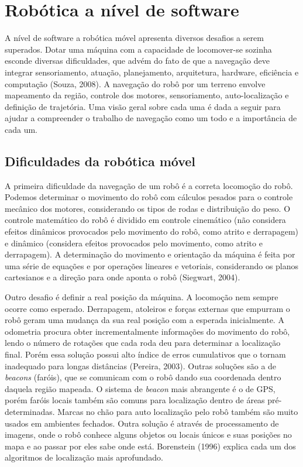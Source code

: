 \section{Robótica a nível de software}

A nível de software a robótica móvel apresenta diversos desafios a serem superados. Dotar uma máquina com a capacidade de locomover-se sozinha esconde diversas dificuldades, que advém do fato de que a navegação deve integrar sensoriamento, atuação, planejamento, arquitetura, hardware, eficiência e computação (Souza, 2008). A navegação do robô por um terreno envolve mapeamento da região, controle dos motores, sensoriamento, auto-localização e definição de trajetória. Uma visão geral sobre cada uma é dada a seguir para ajudar a compreender o trabalho de navegação como um todo e a importância de cada um.

\subsection{Dificuldades da robótica móvel}

A primeira dificuldade da navegação de um robô é a correta locomoção do robô. Podemos determinar o movimento do robô com cálculos pesados para o controle mecânico dos motores, considerando os tipos de rodas e distribuição do peso. O controle matemático do robô é dividido em controle cinemático (não considera efeitos dinâmicos provocados pelo movimento do robô, como atrito e derrapagem) e dinâmico (considera efeitos provocados pelo movimento, como atrito e derrapagem). A determinação do movimento e orientação da máquina é feita por uma série de equações e por operações lineares e vetoriais, considerando os planos cartesianos e a direção para onde aponta o robô (Siegwart, 2004).

Outro desafio é definir a real posição da máquina. A locomoção nem sempre ocorre como esperado. Derrapagem, atoleiros e forças externas que empurram o robô geram uma mudança da sua real posição com a esperada inicialmente. A odometria procura obter incrementalmente informações do movimento do robô, lendo o número de rotações que cada roda deu para determinar a localização final. Porém essa solução possui alto índice de erros cumulativos que o tornam inadequado para longas distâncias (Pereira, 2003). Outras soluções são a de \textit{beacons} (faróis), que se comunicam com o robô dando sua coordenada dentro daquela região mapeada. O sistema de \textit{beacon} mais abrangente é o de GPS, porém faróis locais também são comuns para localização dentro de áreas pré-determinadas. Marcas no chão para auto localização pelo robô também são muito usados em ambientes fechados. Outra solução é através de processamento de imagens, onde o robô conhece alguns objetos ou locais únicos e suas posições no mapa e ao passar por eles sabe onde está. Borenstein (1996) explica cada um dos algoritmos de localização mais aprofundado.

